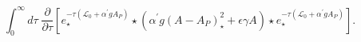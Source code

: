 \begin{equation}
\int_{0}^{\infty }d\tau \;\frac{\partial }{\partial \tau }\left[ e_{\star
}^{-\tau \left( \mathcal{L}_{0}+\alpha ^{\prime }gA_{P}\right) }\star \left(
\alpha ^{\prime }g\left( A-A_{P}\right) _{\star }^{2}+\epsilon
\gamma A\right) \star
e_{\star }^{-\tau \left( \mathcal{L}_{0}+\alpha ^{\prime }gA_{P}\right) }%
\right] .
\end{equation}%
